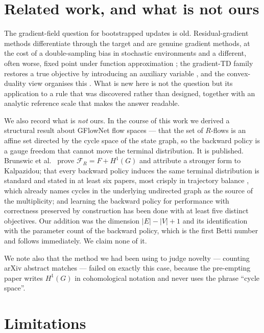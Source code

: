 \documentclass[11pt]{article}
\theoremstyle{remark}
\begin{document}
\section{Related work, and what is not ours}

The gradient-field question for bootstrapped updates is old. Residual-gradient
methods differentiate through the target and are genuine gradient methods, at the
cost of a double-sampling bias in stochastic environments and a different, often
worse, fixed point under function approximation \cite{baird1995residual}; the
gradient-TD family restores a true objective by introducing an auxiliary variable
\cite{sutton2009gtd}, and the convex-duality view organises this
\cite{nachum2020fenchel}. What is new here is not the question but its
application to a rule that was discovered rather than designed, together with an
analytic reference scale that makes the answer readable.

We also record what is \emph{not} ours. In the course of this work we derived a
structural result about GFlowNet flow spaces --- that the set of $R$-flows is an
affine set directed by the cycle space of the state graph, so the backward policy
is a gauge freedom that cannot move the terminal distribution. It is published.
Brunswic et al.\ \cite{brunswic2024nonacyclic} prove $\mathcal F_R = F + H^1(G)$
and attribute a stronger form to Kalpazidou; that every backward policy induces
the same terminal distribution is standard and stated in at least six papers,
most crisply in trajectory balance \cite{malkin2022tb}, which already names
cycles in the underlying undirected graph as the source of the multiplicity;
and learning the backward policy for performance with correctness preserved by
construction has been done with at least five distinct objectives. Our addition
was the dimension $|E| - |V| + 1$ and its identification with the parameter count
of the backward policy, which is the first Betti number and follows immediately.
We claim none of it.

We note also that the method we had been using to judge novelty --- counting
arXiv abstract matches --- failed on exactly this case, because the pre-empting
paper writes $H^1(G)$ in cohomological notation and never uses the phrase
``cycle space''.

\section{Limitations}
\end{document}
